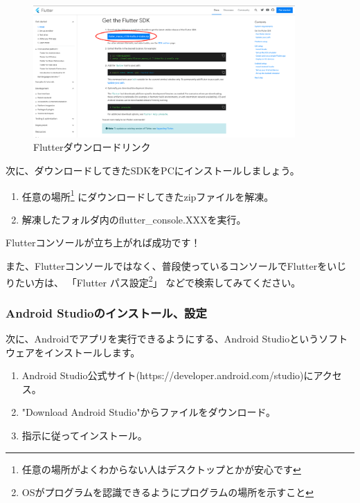\documentclass{jsarticle}
\begin{document}
                \begin{figure}[ht]
                    \centering
                    \includegraphics[width=10cm]{images/flutter_download_link.png}
                    \caption{Flutterダウンロードリンク}
                    \label{fig:flutter_download_link}
                \end{figure}

                次に、ダウンロードしてきたSDKをPCにインストールしましょう。

                \begin{enumerate}
                    \item 任意の場所\footnote{任意の場所がよくわからない人はデスクトップとかが安心です}
                          にダウンロードしてきたzipファイルを解凍。
                    \item 解凍したフォルダ内のflutter\_console.XXXを実行。
                \end{enumerate}

                Flutterコンソールが立ち上がれば成功です！

                また、Flutterコンソールではなく、普段使っているコンソールでFlutterをいじりたい方は、
                「Flutter パス設定\footnote{OSがプログラムを認識できるようにプログラムの場所を示すこと}」
                などで検索してみてください。
            
            \subsubsection*{Android Studioのインストール、設定}
                次に、Androidでアプリを実行できるようにする、Android Studioというソフトウェアをインストールします。
                \begin{enumerate}
                    \item Android Studio公式サイト(https://developer.android.com/studio)にアクセス。
                    \item "Download Android Studio"からファイルをダウンロード。
                    \item 指示に従ってインストール。
                \end{enumerate}
\end{document}
